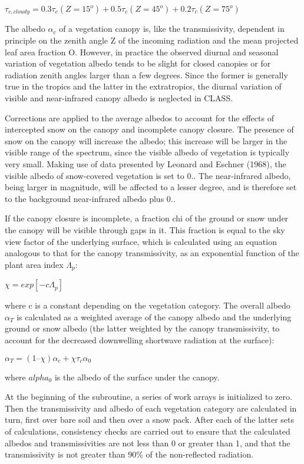 $\tau_{c,cloudy} = 0.3 \tau_c(Z=15^o) + 0.5 \tau_c(Z=45^o) + 0.2 \tau_c(Z=75^o)$

The albedo $\alpha_c$ of a vegetation canopy is, like the transmissivity, dependent in principle on the zenith angle Z of the incoming radiation and the mean projected leaf area fraction O. However, in practice the observed diurnal and seasonal variation of vegetation albedo tends to be slight for closed canopies or for radiation zenith angles larger than a few degrees. Since the former is generally true in the tropics and the latter in the extratropics, the diurnal variation of visible and near-\/infrared canopy albedo is neglected in C\+L\+A\+S\+S.

Corrections are applied to the average albedos to account for the effects of intercepted snow on the canopy and incomplete canopy closure. The presence of snow on the canopy will increase the albedo; this increase will be larger in the visible range of the spectrum, since the visible albedo of vegetation is typically very small. Making use of data presented by Leonard and Eschner (1968), the visible albedo of snow-\/covered vegetation is set to 0.. The near-\/infrared albedo, being larger in magnitude, will be affected to a lesser degree, and is therefore set to the background near-\/infrared albedo plus 0..

If the canopy closure is incomplete, a fraction chi of the ground or snow under the canopy will be visible through gaps in it. This fraction is equal to the sky view factor of the underlying surface, which is calculated using an equation analogous to that for the canopy transmissivity, as an exponential function of the plant area index $\Lambda_p$\+:

$\chi = exp[-c\Lambda_p]$

where c is a constant depending on the vegetation category. The overall albedo $\alpha_T$ is calculated as a weighted average of the canopy albedo and the underlying ground or snow albedo (the latter weighted by the canopy transmissivity, to account for the decreased downwelling shortwave radiation at the surface)\+:

$\alpha_T = (1 – \chi) \alpha_c + \chi \tau_c \alpha_0$

where $alpha_0$ is the albedo of the surface under the canopy.

At the beginning of the subroutine, a series of work arrays is initialized to zero. Then the transmissivity and albedo of each vegetation category are calculated in turn, first over bare soil and then over a snow pack. After each of the latter sets of calculations, consistency checks are carried out to ensure that the calculated albedos and transmissivities are not less than 0 or greater than 1, and that the transmissivity is not greater than 90\% of the non-\/reflected radiation.

